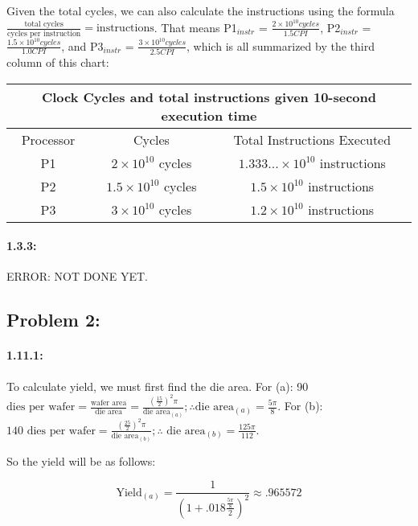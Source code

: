 \documentclass[a4paper]{article}
\begin{document}
Given the total cycles, we can also calculate the instructions using the formula $\frac{\mbox{total cycles}}{\mbox{cycles per instruction}} = \mbox{instructions}$. That means P1$_{instr}$ = $\frac{2\times10^{10} cycles}{1.5 CPI}$, P2$_{instr}$ = $\frac{1.5\times10^{10} cycles}{1.0 CPI}$, and P3$_{instr}$ = $\frac{3\times10^{10} cycles}{2.5 CPI}$, which is all summarized by the third column of this chart:
\begin{center}
\begin{tabular}{|c|c|c|c|c|}
\hline
\multicolumn{5}{|c|}{Clock Cycles and total instructions given 10-second execution time}\\
\hline
\hline
Processor & \multicolumn{2}{|c|}{Cycles} & \multicolumn{2}{|c|}{Total Instructions Executed}\\
\hline
P1 & \multicolumn{2}{|c|}{$2\times10^{10}$ cycles} & \multicolumn{2}{|c|}{$1.333...\times10^{10}$ instructions}\\
\hline
P2 & \multicolumn{2}{|c|}{$1.5\times10^{10}$ cycles} & \multicolumn{2}{|c|}{$1.5\times10^{10}$ instructions}\\
\hline
P3 & \multicolumn{2}{|c|}{$3\times10^{10}$ cycles} & \multicolumn{2}{|c|}{$1.2\times10^{10}$ instructions}\\
\hline
\end{tabular}
\end{center}

\paragraph*{1.3.3:} ERROR: NOT DONE YET.

\subsection*{Problem 2:}

\paragraph*{1.11.1:} To calculate yield, we must first find the die area. For (a): 90 $\mbox{dies per wafer} = \frac{\mbox{wafer area}}{\mbox{die area}} = \frac{(\frac{15}{2})^2\pi}{\mbox{die area}_{(a)}}; \therefore \mbox{die area}_{(a)} = \frac{5\pi}{8}$. For (b): $140\mbox{ dies per wafer} = \frac{(\frac{25}{2})^2\pi}{\mbox{die area}_{(b)}}; \therefore \mbox{ die area}_{(b)} = \frac{125\pi}{112}$.

So the yield will be as follows:

\begin{equation}
\mbox{Yield}_{(a)} = \frac{1}{(1+.018 \frac{\frac{5\pi}{8}}{2})^2} \approx{.965572}
\end{equation}
\end{document}
